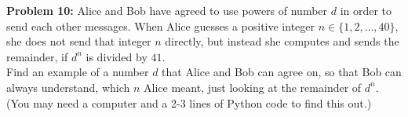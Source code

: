 \documentclass[jou]{apa6}
\begin{document}
\vspace{2ex}
{\bf Problem 10:} Alice and Bob have agreed to use
powers of number $d$ in order to send each other messages.
When Alice guesses
a positive integer $n \in \{ 1,2,\ldots,40 \}$, 
she does not send that integer $n$ directly, but instead
she computes and sends the remainder, if $d^n$ is divided by $41$.\\
Find an example of a number $d$ that Alice and Bob can 
agree on, so that Bob can always understand, 
which $n$ Alice meant, just looking at the remainder of $d^n$.\\
(You may need a computer and a 2-3 lines of Python code to find this out.)
\end{document}
